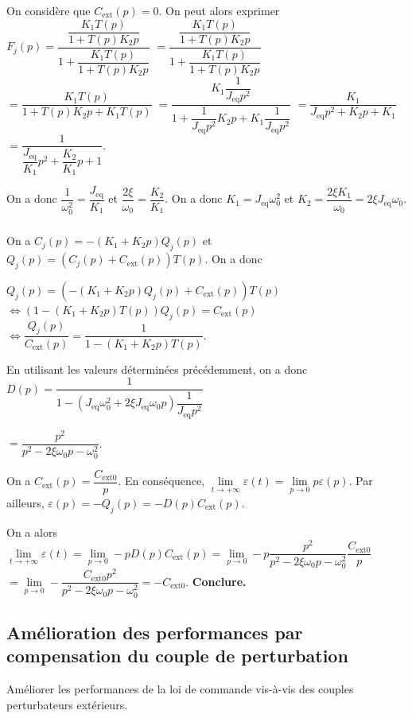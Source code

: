 \documentclass[10pt,fleqn]{article} %
\begin{document}
On considère que $C_{\text{ext}}(p)=0$.  On peut alors exprimer 
$F_j(p)= \dfrac{\dfrac{K_1T(p)}{1+T(p)K_2 p} }{1+\dfrac{K_1T(p)}{1+T(p)K_2 p}}$
$= \dfrac{\dfrac{K_1T(p)}{1+T(p)K_2 p} }{1+\dfrac{K_1T(p)}{1+T(p)K_2 p}}$
$= \dfrac{K_1T(p) }{1+T(p)K_2 p+K_1T(p)}$
$= \dfrac{K_1\dfrac{1}{J_{\text{eq}}p^2}}{1+\dfrac{1}{J_{\text{eq}}p^2}K_2 p+K_1\dfrac{1}{J_{\text{eq}}p^2}}$
$= \dfrac{K_1}{J_{\text{eq}}p^2+K_2 p+K_1}$
$= \dfrac{1}{\dfrac{J_{\text{eq}}}{K_1}p^2+\dfrac{K_2}{K_1}p+1}$.

On a donc $\dfrac{1}{\omega_0^2}=\dfrac{J_{\text{eq}}}{K_1}$ et $\dfrac{2\xi}{\omega_0}=\dfrac{K_2}{K_1}$. On a donc $K_1=J_{\text{eq}}\omega_0^2$ et $K_2=\dfrac{2\xi K_1}{\omega_0}=2\xi J_{\text{eq}}\omega_0$.

\subparagraph{}%
On a $C_j(p)=-\left(K_1+K_2 p\right) Q_j(p)$ et $Q_j(p)=\left(C_j(p)+C_{\text{ext}}(p)\right)T(p)$.  On a donc  

$Q_j(p)=\left(-\left(K_1+K_2 p\right) Q_j(p)+C_{\text{ext}}(p)\right)T(p)$
$\Leftrightarrow \left(1-\left(K_1+K_2 p\right)T(p) \right)Q_j(p)=C_{\text{ext}}(p)$
$\Leftrightarrow \dfrac{Q_j(p)}{C_{\text{ext}}(p)}=\dfrac{1}{1-\left(K_1+K_2 p\right)T(p) }$.

En utilisant les valeurs déterminées précédemment, on a donc $D(p)=\dfrac{1}{1-\left(J_{\text{eq}}\omega_0^2+2\xi J_{\text{eq}}\omega_0 p\right)\dfrac{1}{J_{\text{eq}}p^2} }$

$=\dfrac{p^2}{p^2-2\xi\omega_0 p-\omega_0^2 }$.

On a $C_{\text{ext}}(p)=\dfrac{C_{\text{ext} 0}}{p}$. En conséquence, 
$\lim\limits_{t\to +\infty} \varepsilon(t) = \lim\limits_{p\to 0} p\varepsilon(p)$.
Par ailleurs,  $\varepsilon(p)=-Q_j(p)=-D(p)C_{\text{ext}}(p)$.

On a alors $\lim\limits_{t\to +\infty} \varepsilon(t) = \lim\limits_{p\to 0} -pD(p)C_{\text{ext}}(p)= \lim\limits_{p\to 0} -p\dfrac{p^2}{p^2-2\xi\omega_0 p-\omega_0^2 }\dfrac{C_{\text{ext} 0}}{p}$
$= \lim\limits_{p\to 0} -\dfrac{C_{\text{ext} 0}p^2}{p^2-2\xi\omega_0 p-\omega_0^2 }  = -C_{\text{ext} 0}$.
\textbf{Conclure.}


\subsection{Amélioration des performances par compensation du couple de perturbation}
\begin{obj}
Améliorer les performances de la loi de commande vis-à-vis des couples perturbateurs extérieurs.
\end{obj}
\end{document}
